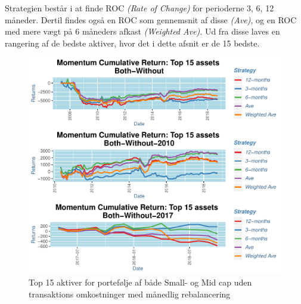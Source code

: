 \documentclass[]{article}
\begin{document}
Strategien består i at finde ROC \emph{(Rate of Change)} for perioderne
3, 6, 12 måneder. Dertil findes også en ROC som gennemsnit af disse
\emph{(Ave)}, og en ROC med mere vægt på 6 måneders afkast
\emph{(Weighted Ave)}. Ud fra disse laves en rangering af de bedste
aktiver, hvor det i dette afsnit er de 15 bedste.

\begin{figure}
\centering
\includegraphics{IPA_Small_and_Mid_files/figure-latex/fig4-1.pdf}
\caption{\label{fig:withOut}Top 15 aktiver for portefølje af både Small-
og Mid cap uden transaktions omkostninger med månedlig rebalancering}
\end{figure}
\end{document}
